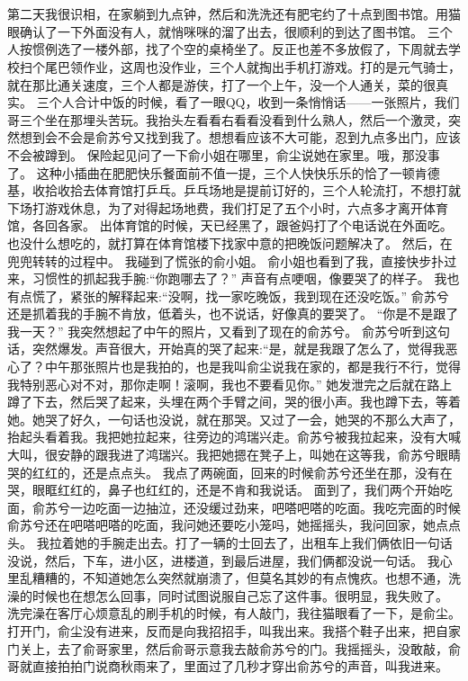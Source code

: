 \chapter{}
第二天我很识相，在家躺到九点钟，然后和洗洗还有肥宅约了十点到图书馆。用猫眼确认了一下外面没有人，就悄咪咪的溜了出去，很顺利的到达了图书馆。
三个人按惯例选了一楼外部，找了个空的桌椅坐了。反正也差不多放假了，下周就去学校扫个尾巴领作业，这周也没作业，三个人就掏出手机打游戏。打的是元气骑士，就在那比通关速度，三个人都是游侠，打了一个上午，没一个人通关，菜的很真实。
三个人合计中饭的时候，看了一眼QQ，收到一条悄悄话——一张照片，我们哥三个坐在那埋头苦玩。我抬头左看看右看看没看到什么熟人，然后一个激灵，突然想到会不会是俞苏兮又找到我了。想想看应该不大可能，忍到九点多出门，应该不会被蹲到。
保险起见问了一下俞小姐在哪里，俞尘说她在家里。哦，那没事了。
这种小插曲在肥肥快乐餐面前不值一提，三个人快快乐乐的恰了一顿肯德基，收拾收拾去体育馆打乒乓。乒乓场地是提前订好的，三个人轮流打，不想打就下场打游戏休息，为了对得起场地费，我们打足了五个小时，六点多才离开体育馆，各回各家。
出体育馆的时候，天已经黑了，跟爸妈打了个电话说在外面吃。也没什么想吃的，就打算在体育馆楼下找家中意的把晚饭问题解决了。
然后，在兜兜转转的过程中。
我碰到了慌张的俞小姐。
俞小姐也看到了我，直接快步扑过来，习惯性的抓起我手腕:“你跑哪去了？”
声音有点哽咽，像要哭了的样子。
我也有点慌了，紧张的解释起来:“没啊，找一家吃晚饭，我到现在还没吃饭。”
俞苏兮还是抓着我的手腕不肯放，低着头，也不说话，好像真的要哭了。
“你是不是跟了我一天？” 我突然想起了中午的照片，又看到了现在的俞苏兮。
俞苏兮听到这句话，突然爆发。声音很大，开始真的哭了起来:“是，就是我跟了怎么了，觉得我恶心了？中午那张照片也是我拍的，也是我叫俞尘说我在家的，都是我行不行，觉得我特别恶心对不对，那你走啊！滚啊，我也不要看见你。”
她发泄完之后就在路上蹲了下去，然后哭了起来，头埋在两个手臂之间，哭的很小声。我也蹲下去，等着她。她哭了好久，一句话也没说，就在那哭。又过了一会，她哭的不那么大声了，抬起头看着我。我把她拉起来，往旁边的鸿瑞兴走。俞苏兮被我拉起来，没有大喊大叫，很安静的跟我进了鸿瑞兴。我把她摁在凳子上，叫她在这等我，俞苏兮眼睛哭的红红的，还是点点头。
我点了两碗面，回来的时候俞苏兮还坐在那，没有在哭，眼眶红红的，鼻子也红红的，还是不肯和我说话。
面到了，我们两个开始吃面，俞苏兮一边吃面一边抽泣，还没缓过劲来，吧嗒吧嗒的吃面。我吃完面的时候俞苏兮还在吧嗒吧嗒的吃面，我问她还要吃小笼吗，她摇摇头，我问回家，她点点头。
我拉着她的手腕走出去。打了一辆的士回去了，出租车上我们俩依旧一句话没说，然后，下车，进小区，进楼道，到最后进屋，我们俩都没说一句话。
我心里乱糟糟的，不知道她怎么突然就崩溃了，但莫名其妙的有点愧疚。也想不通，洗澡的时候也在想怎么回事，同时试图说服自己忘了这件事。很明显，我失败了。
洗完澡在客厅心烦意乱的刷手机的时候，有人敲门，我往猫眼看了一下，是俞尘。打开门，俞尘没有进来，反而是向我招招手，叫我出来。我搭个鞋子出来，把自家门关上，去了俞哥家里，然后俞哥示意我去敲俞苏兮的门。我摇摇头，没敢敲，俞哥就直接拍拍门说商秋雨来了，里面过了几秒才穿出俞苏兮的声音，叫我进来。
